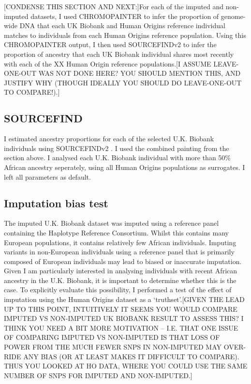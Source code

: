 {\color{red}[CONDENSE THIS SECTION AND NEXT:]For each of the imputed and non-imputed datasets, I used CHROMOPAINTER to infer the proportion of genome-wide DNA that each UK Biobank and Human Origins reference individual matches to individuals from each Human Origins reference population. Using this CHROMOPAINTER output, I then used SOURCEFINDv2 \cite{Chacon-Duque2018} to infer the proportion of ancestry that each UK Biobank individual shares most recently with each of the XX Human Origin reference populations.[I ASSUME LEAVE-ONE-OUT WAS NOT DONE HERE? YOU SHOULD MENTION THIS, AND JUSTIFY WHY (THOUGH IDEALLY YOU SHOULD DO LEAVE-ONE-OUT TO COMPARE!).]}


\subsection{SOURCEFIND}

I estimated ancestry proportions for each of the selected U.K. Biobank individuals using SOURCEFINDv2 \cite{Chacon-Duque2018}. I used the combined painting from the section above. I analysed each U.K. Biobank individual with more than 50\% African ancestry seperately, using all Human Origins populations as surrogates. I left all parameters as default. 

\subsection{Imputation bias test}

The imputed U.K. Biobank dataset was imputed using a reference panel containing the Haplotype Reference Consortium. Whilst this contains many European populations, it contains relatively few African individuals. Imputing variants in non-European individuals using a reference panel that is primarily composed of European individuals may lead to biased or inaccurate imputation. Given I am particularly interested in analysing individuals with recent African ancestry in the U.K. Biobank, it is important to determine whether this is the case. To explicitly evaluate this possibility, I performed a test of the effect of imputation using the Human Origins dataset as a `truthset'.{\color{red}[GIVEN THE LEAD UP TO THIS POINT, INTUITIVELY IT SEEMS YOU WOULD COMPARE IMPUTED VS NON-IMPUTED UK BIOBANK RESULT TO ASSESS THIS? I THINK YOU NEED A BIT MORE MOTIVATION -- I.E. THAT ONE ISSUE OF COMPARING IMPUTED VS NON-IMPUTED IS THAT LOSS OF POWER FROM THE MUCH FEWER SNPS IN NON-IMPUTED MAY OVER-RIDE ANY BIAS (OR AT LEAST MAKES IT DIFFICULT TO COMPARE). THUS YOU LOOKED AT HO DATA, WHERE YOU COULD USE THE SAME NUMBER OF SNPS FOR IMPUTED AND NON-IMPUTED.]}
 
